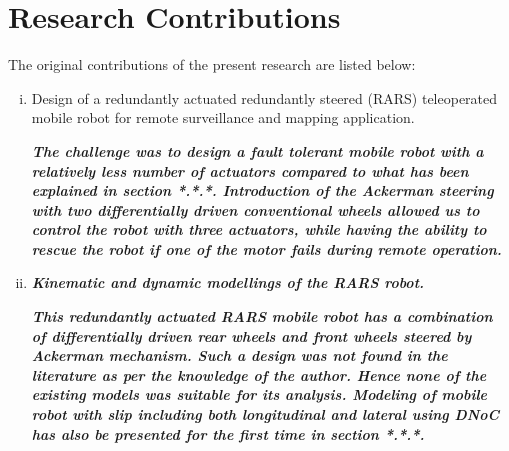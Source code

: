 \section{Research Contributions}
The original contributions of the present research are listed below:
\begin{enumerate}[(i)]

\item Design of a redundantly actuated redundantly steered (RARS)  teleoperated mobile robot for remote surveillance and mapping application.

 \textbf{\textit{The challenge was to design a fault tolerant mobile robot with a relatively less number of actuators compared to what has been explained in section *.*.*. Introduction of the Ackerman steering with two differentially  driven  conventional wheels allowed us to control the robot with three actuators, while having the ability to rescue the robot if one of the motor fails during remote operation.} }
		
	
\item \textbf{\textit{ Kinematic and dynamic modellings of the RARS robot.}}


		 \textbf{\textit{This redundantly actuated RARS mobile robot  has a combination of differentially driven rear wheels and front wheels steered by  Ackerman mechanism. Such a design was not found in the literature as per the knowledge of the author. Hence none of the existing models was suitable for its analysis. Modeling of mobile robot with slip including both longitudinal and lateral using DNoC has also be presented for the first time in section *.*.*.     }} 
		

\end{enumerate}
